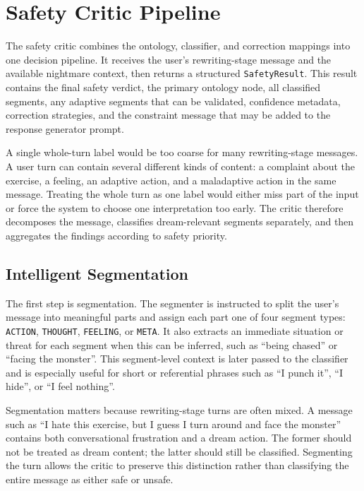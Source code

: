 \section{Safety Critic Pipeline}
\label{sec:safety-critic-pipeline}

The safety critic combines the ontology, classifier, and correction mappings into one decision pipeline. It receives the user's rewriting-stage message and the available nightmare context, then returns a structured \texttt{SafetyResult}. This result contains the final safety verdict, the primary ontology node, all classified segments, any adaptive segments that can be validated, confidence metadata, correction strategies, and the constraint message that may be added to the response generator prompt.

A single whole-turn label would be too coarse for many rewriting-stage messages. A user turn can contain several different kinds of content: a complaint about the exercise, a feeling, an adaptive action, and a maladaptive action in the same message. Treating the whole turn as one label would either miss part of the input or force the system to choose one interpretation too early. The critic therefore decomposes the message, classifies dream-relevant segments separately, and then aggregates the findings according to safety priority.

\subsection{Intelligent Segmentation}

The first step is segmentation. The segmenter is instructed to split the user's message into meaningful parts and assign each part one of four segment types: \texttt{ACTION}, \texttt{THOUGHT}, \texttt{FEELING}, or \texttt{META}. It also extracts an immediate situation or threat for each segment when this can be inferred, such as ``being chased'' or ``facing the monster''. This segment-level context is later passed to the classifier and is especially useful for short or referential phrases such as ``I punch it'', ``I hide'', or ``I feel nothing''.

Segmentation matters because rewriting-stage turns are often mixed. A message such as ``I hate this exercise, but I guess I turn around and face the monster'' contains both conversational frustration and a dream action. The former should not be treated as dream content; the latter should still be classified. Segmenting the turn allows the critic to preserve this distinction rather than classifying the entire message as either safe or unsafe.

